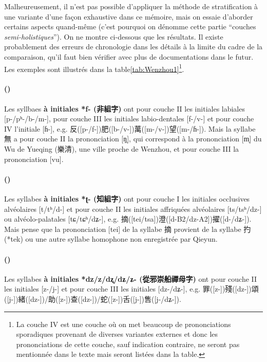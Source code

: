 \documentclass{scrbook}
\newcounter{c}[subsubsection]
\newcommand{\stpc}[1]{\stepcounter{#1}}
\newcommand{\illustre}{Les exemples sont illustrés dans la table\xspace}
\newcommand{\termyyx}[1]{\textbf{#1}}
\begin{document}
\begin{sloppypar}

Malheureusement, il n'est pas possible d'appliquer la méthode de stratification à une variante d'une façon exhaustive dans ce mémoire, mais on essaie d'aborder certains aspects quand-même (c'est pourquoi on dénomme cette partie ``couches \textit{semi-holistiques}''). On ne montre ci-dessous que les résultats. Il existe probablement des erreurs de chronologie dans les détails à la limite du cadre de la comparaison, qu'il faut bien vérifier avec plus de documentations dans le futur.  \illustre \ref{tab:Wenzhou1}\footnote{La couche IV est une couche où on met beaucoup de prononciations sporadiques provenant de diverses variantes externes et donc les prononciations de cette couche, sauf indication contraire, ne seront pas mentionnée dans le texte mais seront listées dans la table.}. %

\stpc{c}\paragraph{()}
Les syllbaes \termyyx{à initiales *f- (非組字)} ont pour couche II les initiales labiales [p-/pʰ-/b-/m-], pour couche III les initiales labio-dentales [f-/v-] et pour couche IV l'initiale [ɦ-], e.g. 反([p-/f-])肥([b-/v-])萬([m-/v-])望([m-/ɦ-]). Mais la syllabe 無 a pour couche II la prononciation [ŋ̩], qui correspond à la prononciation [m̩] du Wu de Yueqing (樂清), une ville proche de Wenzhou, et pour couche III la prononciation [vu]. 

\stpc{c}\paragraph{()}
Les syllabes \termyyx{à initiales *ʈ- (知組字)} ont pour couche I les initiales occlusives alvéolaires [t/tʰ/d-] et pour couche II les initiales affriquées alvéolaires [ts/tsʰ/dz-] ou alvéolo-palatales [tɕ/tɕʰ/dʑ-], e.g. 摘([tei/tsa])澄([d-B2/dz-A2])擢([d-/dʑ-]). Mais \textcite[72--74]{Zhuang2016zhi2} pense que la prononciation [tei] de la syllabe 摘 provient de la syllabe 扚 (*tek) ou une autre syllabe homophone non enregistrée par Qieyun.

\stpc{c}\paragraph{()}
Les syllabes \termyyx{à initiales *dz/z/dʐ/dʑ/ʑ- (從邪崇船禪母字)} ont pour couche II les initiales [z-/j-] et pour couche III les initiales [dz-/dʑ-], e.g. 罪([z-])殘([dz-])頌([j-])緒([dz-])/助([z-])查([dz-])/蛇([z-])舌([j-])售([j-/dʑ-]).


\end{sloppypar}
\end{document}
